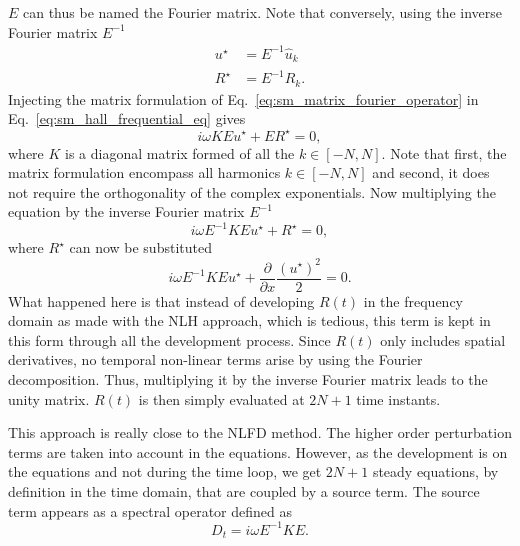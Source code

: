 $E$ can thus be named the Fourier matrix.
Note that conversely, using the inverse Fourier matrix $E^{-1}$
\begin{equation}
	\begin{split}
		u^\star &= E^{-1} \widehat{u}_k \\
		R^\star &= E^{-1} \widehat{R}_k.
	\end{split}
	\label{eq:sm_sampling_hb_var}
\end{equation}
Injecting the matrix formulation of 
Eq.~\eqref{eq:sm_matrix_fourier_operator} in 
Eq.~\eqref{eq:sm_hall_frequential_eq}
gives
\begin{equation}
	i \omega K E u^\star + E R^\star = 0,
\end{equation}
where $K$ is a diagonal matrix formed of all the $k \in [-N, N]$.
Note that first, the matrix formulation encompass all harmonics
$k \in [-N, N]$ and second, it does not require the
orthogonality of the complex exponentials.
Now multiplying the equation by the inverse Fourier matrix $E^{-1}$
\begin{equation}
	i \omega E^{-1} K E u^\star + R^\star = 0,
	\label{eq:sm_hb_matrix_form_mono}
\end{equation}
where $R^\star$ can now be substituted
\begin{equation}
		i \omega E^{-1} K E u^\star + 
		\displaystyle \frac{\partial}{\partial x}
		\frac{(u^\star)^2}{2} = 0.
\end{equation}
What happened here is that instead of developing $R(t)$
in the frequency domain as made with the NLH approach,
which is tedious, this term is kept
in this form through all the development process. 
Since $R(t)$ only includes spatial derivatives, no temporal non-linear
terms
arise by using the Fourier decomposition. Thus, multiplying it
by the inverse Fourier matrix leads to the unity matrix. 
$R(t)$ is then simply evaluated at $2N+1$ time instants.

This approach is really close to the NLFD method.
The higher order perturbation terms are taken into account
in the equations.
However,
as the development is on the equations and not during the time loop,
we get $2N+1$ steady equations, by definition in the time
domain, that are coupled by a source term.
The source term appears as a spectral operator defined as
\begin{equation}
	D_t = i \omega E^{-1} K E.
	\label{eq:sm_hb_mono_source_term_matrix}
\end{equation}

